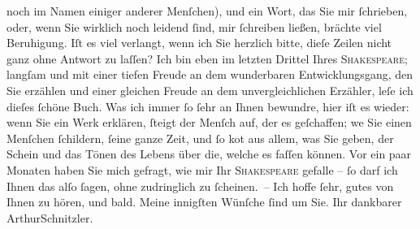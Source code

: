 \begin{ledgroupsized}[t]{13cm}
                    noch im Namen einiger anderer Menſchen), und ein Wort, das Sie mir ſchrieben,
                    oder, wenn Sie wirklich noch lei{\pb}dend
                    ſind, mir ſchreiben ließen, brächte viel Beruhigung. Iſt es viel verlangt, wenn
                    ich Sie herzlich bitte, dieſe Zeilen nicht ganz ohne Antwort zu laſſen?\pend
           \pstart
           Ich \introOben{}bin\introOben{} eben im letzten Drittel Ihres \textsc{Shakespeare}; langſam und mit einer tiefen Freude an dem wunderbaren {\pb}Entwicklungsgang, den Sie erzählen und
                    einer gleichen Freude an dem unvergleichlichen Erzähler, leſe ich dieſes ſchöne
                    Buch. Was ich immer ſo ſehr an Ihnen bewundre, hier iſt es wieder: wenn Sie ein
                    Werk erklären, ſteigt der Menſch auf, der es geſchaffen; we{\geminationn}
               Sie einen Menſchen ſchildern, ſeine ganze Zeit,
                    und {\pb}ſo ko{\geminationm}t aus
                    allem, was Sie geben, der Schein und das Tönen des Lebens über die, welche es
                    faſſen können. Vor ein paar Monaten haben Sie mich gefragt, wie mir Ihr
                        \textsc{Shakespeare} gefalle – ſo darf ich Ihnen das alſo ſagen, ohne zudringlich zu
                    ſcheinen. –\pend
           \pstart Ich hoffe ſehr, gutes von Ihnen zu hören, und bald. Meine innigſten Wünſche
                    ſind um Sie. Ihr dankbarer \spacefill\mbox{ArthurSchnitzler.}\pend{}
         
         \endnumbering{}\end{ledgroupsized}  \newcommand{\dateiname}{L00696}\newcommand{\titel}{Arthur Schnitzler an Georg Brandes, 9. 7. 1897}\newcommand{\editorInnen}{Martin Anton Müller und Gerd-Hermann Susen}
      